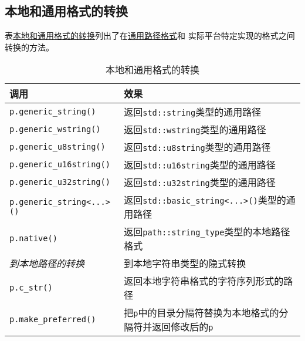 \subsection{本地和通用格式的转换}\label{ch20.3.4}
表\hyperref[t20.6]{本地和通用格式的转换}列出了在\hyperref[ch20.2.3]{通用路径格式}和
实际平台特定实现的格式之间转换的方法。
\begin{table}[htb]
    \centering
    \begin{tabular}{l|l}
        \hline
        \textbf{调用}                       & \textbf{效果}                                    \\
        \hline
        \texttt{p.generic\_string()}      & 返回\texttt{std::string}类型的通用路径                  \\
        \texttt{p.generic\_wstring()}     & 返回\texttt{std::wstring}类型的通用路径                 \\
        \texttt{p.generic\_u8string()}    & 返回\texttt{std::u8string}类型的通用路径                \\
        \texttt{p.generic\_u16string()}   & 返回\texttt{std::u16string}类型的通用路径               \\
        \texttt{p.generic\_u32string()}   & 返回\texttt{std::u32string}类型的通用路径               \\
        \texttt{p.generic\_string<...>()} & 返回\texttt{std::basic\_string<...>()}类型的通用路径    \\
        \texttt{p.native()}               & 返回\texttt{path::string\_type}类型的本地路径格式         \\
        \emph{到本地路径的转换}                   & 到本地字符串类型的隐式转换                                  \\
        \texttt{p.c\_str()}               & 返回本地字符串格式的字符序列形式的路径                            \\
        \texttt{p.make\_preferred()}      & 把\texttt{p}中的目录分隔符替换为本地格式的分隔符并返回修改后的\texttt{p} \\
        \hline
    \end{tabular}
    \caption{本地和通用格式的转换}
    \label{t20.6}
\end{table}

